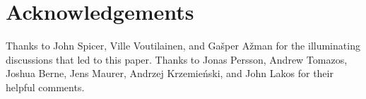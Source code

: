 

\section*{Acknowledgements}
Thanks to John Spicer, Ville Voutilainen, and Ga\v sper A\v zman for the illuminating discussions that led to this paper. Thanks to Jonas Persson, Andrew Tomazos, Joshua Berne, Jens Maurer, Andrzej Krzemie\' nski, and John Lakos for their helpful comments.


\renewcommand{\bibname}{References}





